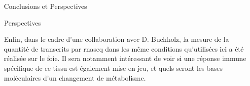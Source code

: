 \documentclass[../main.tex]{subfiles}
\begin{document}
\begin{chapter}{Conclusions et Perspectives}
\begin{section}{Perspectives}


Enfin, dans le cadre d'une collaboration avec D. Buchholz, la mesure de la quantité de transcrits par \gls{rnaseq} dans les même conditions qu'utilisées ici a été réalisée sur le foie.
Il sera notamment intéressant de voir si une réponse immune spécifique de ce tissu est également mise en jeu, et quels seront les bases moléculaires d'un changement de métabolisme.

\end{section}

\end{chapter}
\end{document}
